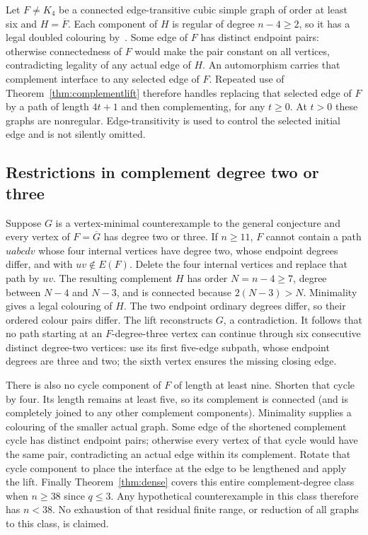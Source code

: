 Let $F\ne K_4$ be a connected edge-transitive cubic simple graph
of order at least six and $H=\overline F$. Each component of $H$
is regular of degree $n-4\ge2$, so it has a legal doubled colouring
by~\cite{GOW26}. Some edge of $F$ has distinct endpoint pairs:
otherwise connectedness of $F$ would make the pair constant on all
vertices, contradicting legality of any actual edge of $H$.
An automorphism carries that complement interface to any selected
edge of $F$. Repeated use of Theorem~\ref{thm:complementlift}
therefore handles replacing that selected edge of $F$ by a path
of length $4t+1$ and then complementing, for any $t\ge0$. At
$t>0$ these graphs are nonregular. Edge-transitivity is used to
control the selected initial edge and is not silently omitted.

\subsection{Restrictions in complement degree two or three}

Suppose $G$ is a vertex-minimal counterexample to the general
conjecture and every vertex of $F=\overline G$ has degree two or
three. If $n\ge11$, $F$ cannot contain a path $uabcdv$ whose four
internal vertices have degree two, whose endpoint degrees differ,
and with $uv\notin E(F)$. Delete the four internal vertices and
replace that path by $uv$. The resulting complement $H$ has order
$N=n-4\ge7$, degree between $N-4$ and $N-3$, and is connected
because $2(N-3)>N$. Minimality gives a legal colouring of $H$.
The two endpoint ordinary degrees differ, so their ordered colour
pairs differ. The lift reconstructs $G$, a contradiction.
It follows that no path starting at an $F$-degree-three vertex can
continue through six consecutive distinct degree-two vertices:
use its first five-edge subpath, whose endpoint degrees are three
and two; the sixth vertex ensures the missing closing edge.

There is also no cycle component of $F$ of length at least nine.
Shorten that cycle by four. Its length remains at least five, so
its complement is connected (and is completely joined to any other
complement components). Minimality supplies a colouring of the
smaller actual graph. Some edge of the shortened complement cycle
has distinct endpoint pairs; otherwise every vertex of that cycle
would have the same pair, contradicting an actual edge within its
complement. Rotate that cycle component to place the interface at
the edge to be lengthened and apply the lift. Finally
Theorem~\ref{thm:dense} covers this entire complement-degree class
when $n\ge38$ since $q\le3$. Any hypothetical counterexample in
this class therefore has $n<38$. No exhaustion of that residual
finite range, or reduction of all graphs to this class, is claimed.
